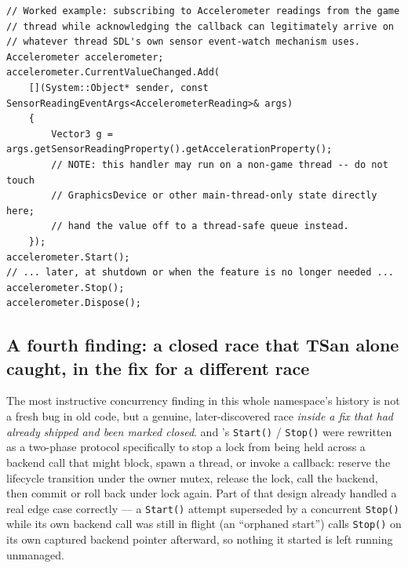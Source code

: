 \begin{lstlisting}
// Worked example: subscribing to Accelerometer readings from the game
// thread while acknowledging the callback can legitimately arrive on
// whatever thread SDL's own sensor event-watch mechanism uses.
Accelerometer accelerometer;
accelerometer.CurrentValueChanged.Add(
    [](System::Object* sender, const SensorReadingEventArgs<AccelerometerReading>& args)
    {
        Vector3 g = args.getSensorReadingProperty().getAccelerationProperty();
        // NOTE: this handler may run on a non-game thread -- do not touch
        // GraphicsDevice or other main-thread-only state directly here;
        // hand the value off to a thread-safe queue instead.
    });
accelerometer.Start();
// ... later, at shutdown or when the feature is no longer needed ...
accelerometer.Stop();
accelerometer.Dispose();
\end{lstlisting}

\subsection{A fourth finding: a closed race that TSan alone caught, in the fix for a different race}

The most instructive concurrency finding in this whole namespace's history is not a fresh bug
in old code, but a genuine, later-discovered race \emph{inside a fix that had already shipped
and been marked closed}.  and 's \texttt{Start()} /
\texttt{Stop()} were rewritten as a two-phase protocol specifically to stop a lock from being
held across a backend call that might block, spawn a thread, or invoke a callback: reserve the
lifecycle transition under the owner mutex, release the lock, call the backend, then commit or
roll back under lock again. Part of that design already handled a real edge case correctly ---
a \texttt{Start()} attempt superseded by a concurrent \texttt{Stop()} while its own backend
call was still in flight (an ``orphaned start'') calls \texttt{Stop()} on its own captured
backend pointer afterward, so nothing it started is left running unmanaged.

